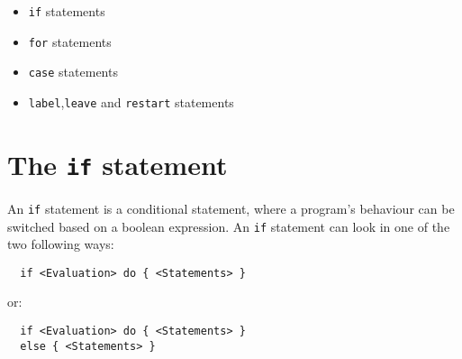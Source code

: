 
\begin{itemize}\setlength{\itemsep}{-2pt}
\item \texttt{if} statements
\item \texttt{for} statements
\item \texttt{case} statements
\item \texttt{label},\texttt{leave} and \texttt{restart} statements
\end{itemize}

\section{The \texttt{if} statement}

An \texttt{if} statement is a conditional statement, where a program's
behaviour can be switched based on a boolean expression. An \texttt{if}
statement can look in one of the two following ways:

\begin{verbatim}
  if <Evaluation> do { <Statements> }
\end{verbatim}
or:
\begin{verbatim}
  if <Evaluation> do { <Statements> }
  else { <Statements> }
\end{verbatim}


